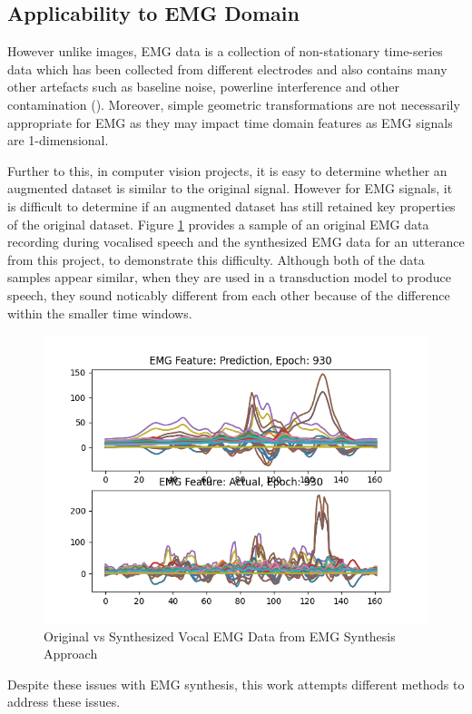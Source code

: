 \subsection{Applicability to EMG Domain}

However unlike images, EMG data is a collection of non-stationary
time-series data which has been collected from different electrodes
and also contains many other artefacts such as baseline noise,
powerline interference and other contamination (\cite{semg_filtering}).
Moreover, simple geometric transformations are not necessarily appropriate
for EMG as they may impact time domain features as EMG signals are
1-dimensional.

Further to this, in computer vision projects, it is easy to determine whether
an augmented dataset is similar to the original signal. However for EMG
signals, it is difficult to determine if an augmented dataset has still
retained key properties of the original dataset.
Figure \ref{fig:real-vs-pred-emg} provides a sample of an original
EMG data recording during vocalised speech and the synthesized EMG
data for an utterance from this project, to demonstrate this difficulty.
Although both of the data samples appear similar, when they are used in
a transduction model to produce speech, they sound noticably different from
each other because of the difference within the smaller time windows.

\begin{figure}[hbtp]
    \caption{Original vs Synthesized Vocal EMG Data from EMG Synthesis Approach}
    \label{fig:real-vs-pred-emg}
    \centering
    \includegraphics[width=0.75\linewidth]{graphics/emg_augment/real_vs_synth.png}
\end{figure}

Despite these issues with EMG synthesis, this work attempts different
methods to address these issues.

